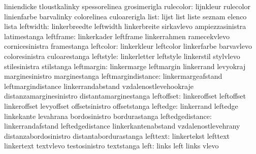                            liniendicke               tloustkalinky
                           spessorelinea             grosimerigla
                rulecolor: lijnkleur                 rulecolor
                           linienfarbe               barvalinky
                           colorelinea               culoarerigla
                     list: lijst                     list
                           liste                     seznam
                           elenco                    lista
                leftwidth: linkerbreedte             leftwidth
                           linkerbreite              sirkavlevo
                           ampiezzasinistra          latimestanga
                leftframe: linkerkader               leftframe
                           linkerrahmen              ramecekvlevo
                           cornicesinistra           framestanga
                leftcolor: linkerkleur               leftcolor
                           linkerfarbe               barvavlevo
                           coloresinistra            culoarestanga
                leftstyle: linkerletter              leftstyle
                           linkerstil                stylvlevo
                           stilesinistra             stilstanga
               leftmargin: linkermarge               leftmargin
                           linkerrand                levyokraj
                           marginesinistro           marginestanga
       leftmargindistance: linkermargeafstand        leftmargindistance
                           linkerrandabstand         vzdalenostlevehookraje
                           distanzamarginesinistro   distantamarginestanga
               leftoffset: linkeroffset              leftoffset
                           linkeroffset              levyoffset
                           offsetsinistro            offsetstanga
                 leftedge: linkerrand                leftedge
                           linkekante                levahrana
                           bordosinistro             bordurastanga
         leftedgedistance: linkerrandafstand         leftedgedistance
                           linkerkantenabstand       vzdalenostlevehrany
                           distanzabordosinistro     distantabordurastanga
                 lefttext: linkertekst               lefttext
                           linkertext                textvlevo
                           testosinistro             textstanga %
                     left: links                     left
                           links                     vlevo
